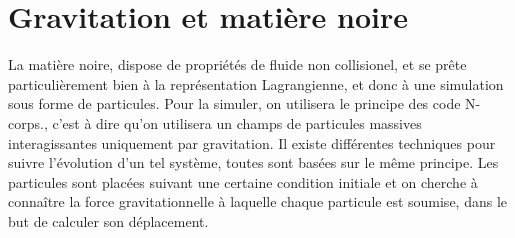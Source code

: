 

%
%

%
%


\section{Gravitation et matière noire}
\label{sec:solverDM}

La matière noire, dispose de propriétés de fluide non collisionel, et se prête particulièrement bien à la représentation Lagrangienne, et donc à une simulation sous forme de particules.
Pour la simuler, on utilisera le principe des code N-corps., c'est à dire qu'on utilisera un champs de particules massives interagissantes uniquement par gravitation.
Il existe différentes techniques pour suivre l'évolution d'un tel système, toutes sont basées sur le même principe.
Les particules sont placées suivant une certaine condition initiale et on cherche à connaître la force gravitationnelle à laquelle chaque particule est soumise, dans le but de calculer son déplacement.




